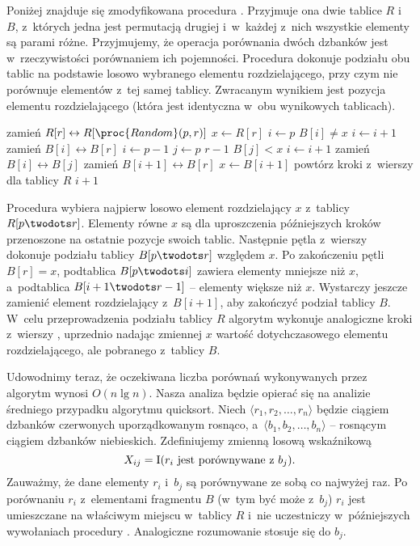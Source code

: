 Poniżej znajduje się zmodyfikowana procedura . Przyjmuje ona dwie tablice $R$ i~$B$, z~których jedna jest permutacją drugiej i~w~każdej z~nich wszystkie elementy są parami różne. Przyjmujemy, że operacja porównania dwóch dzbanków jest w~rzeczywistości porównaniem ich pojemności. Procedura dokonuje podziału obu tablic na podstawie losowo wybranego elementu rozdzielającego, przy czym nie porównuje elementów z~tej samej tablicy. Zwracanym wynikiem jest pozycja elementu rozdzielającego (która jest identyczna w~obu wynikowych tablicach).
\begin{codebox}
\li	zamień $R[r]\leftrightarrow R[\proc{Random}(p,r)]$
\li	$x\gets R[r]$
\li	$i\gets p$
\li	\While $B[i]\ne x$
\li		\Do $i\gets i+1$
		\End
\li	zamień $B[i]\leftrightarrow B[r]$
\li	$i\gets p-1$ \label{li:jugs-partition-first-partition-begin}
\li	\For $j\gets p$ \To $r-1$ \label{li:jugs-partition-for1-begin}
\li		\Do
			\If $B[j]<x$
\li				\Then
					$i\gets i+1$
\li					zamień $B[i]\leftrightarrow B[j]$
				\End
		\End \label{li:jugs-partition-for1-end}
\li	zamień $B[i+1]\leftrightarrow B[r]$ \label{li:jugs-partition-first-partition-end}
\li	$x\gets B[i+1]$
\li	powtórz kroki z~wierszy \twodashes{\ref{li:jugs-partition-first-partition-begin}}{\ref{li:jugs-partition-first-partition-end}} dla tablicy $R$ \label{li:jugs-partition-second-partition}
\li	\Return $i+1$
\end{codebox}

Procedura wybiera najpierw losowo element rozdzielający $x$ z~tablicy $R[p\twodots r]$. Elementy równe $x$ są dla uproszczenia późniejszych kroków przenoszone na ostatnie pozycje swoich tablic. Następnie pętla  z~wierszy \twodashes{\ref{li:jugs-partition-for1-begin}}{\ref{li:jugs-partition-for1-end}} dokonuje podziału tablicy $B[p\twodots r]$ względem $x$. Po zakończeniu pętli $B[r]=x$, podtablica $B[p\twodots i]$ zawiera elementy mniejsze niż $x$, a~podtablica $B[i+1\twodots r-1]$ -- elementy większe niż $x$. Wystarczy jeszcze zamienić element rozdzielający z~$B[i+1]$, aby zakończyć podział tablicy $B$. W~celu przeprowadzenia podziału tablicy $R$ algorytm wykonuje analogiczne kroki z~wierszy \twodashes{\ref{li:jugs-partition-first-partition-begin}}{\ref{li:jugs-partition-first-partition-end}}, uprzednio nadając zmiennej $x$ wartość dotychczasowego elementu rozdzielającego, ale pobranego z~tablicy $B$.

Udowodnimy teraz, że oczekiwana liczba porównań wykonywanych przez algorytm  wynosi $O(n\lg n)$. Nasza analiza będzie opierać się na analizie średniego przypadku algorytmu quicksort. Niech $\langle r_1,r_2,\dots,r_n\rangle$ będzie ciągiem dzbanków czerwonych uporządkowanym rosnąco, a~$\langle b_1,b_2,\dots,b_n\rangle$ -- rosnącym ciągiem dzbanków niebieskich. Zdefiniujemy zmienną losową wskaźnikową
\[
    X_{ij} = \operatorname{I}(\text{$r_i$ jest porównywane z~$b_j$}).
\]
Zauważmy, że dane elementy $r_i$ i~$b_j$ są porównywane ze sobą co najwyżej raz. Po porównaniu $r_i$ z~elementami fragmentu $B$ (w~tym być może z~$b_j$) $r_i$ jest umieszczane na właściwym miejscu w~tablicy $R$ i~nie uczestniczy w~późniejszych wywołaniach procedury . Analogiczne rozumowanie stosuje się do $b_j$.

